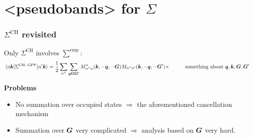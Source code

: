 \documentclass[t]{beamer}
\newcommand{\xmark}{\ding{55}}%
\newcommand{\shortcode}[1]{\texttt{#1}}
\def\\{}%
\def\texttt#1{<#1>}%
\begin{document}
\section{\shortcode{pseudobands} for $\Sigma$}

\begin{frame}
\frametitle{$\Sigma^{\text{CH}}$ revisited}

Only $\Sigma^{\text{CH}}$ involves $\sum^{\text{emp}}$:
\begin{equation}
    \begin{aligned}
        \mel*{n \vb*{k}}{\Sigma^{\text{CH, GPP}}}{n' \vb*{k}} 
        &= \frac{1}{2} \sum_{n''} \sum_{\vb*{q} \vb*{G} \vb*{G}'} M_{n'' n}^*(\vb*{k}, - \vb*{q}, -\vb*{G})
        M_{n'' n'}(\vb*{k}, - \vb*{q}, - \vb*{G}') \times  \\
        &\quad \quad \text{something about $\vb*{q}, \vb*{k}, \vb*{G}, \vb*{G}'$}
    \end{aligned}
    \label{eq:ch.simple}
\end{equation}

\textbf{Problems} \begin{itemize}
    \item No summation over occupied states $\Rightarrow$ 
    \xmark the aforementioned cancellation mechanism 
    \item Summation over $\vb*{G}$ very complicated $\Rightarrow$
    analysis based on $\vb*{G}$ very hard.
\end{itemize}

\end{frame}
\end{document}
